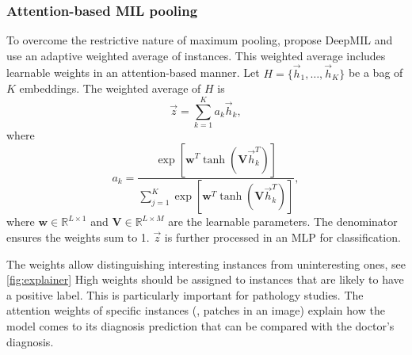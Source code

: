 \subsubsection{Attention-based MIL pooling}
To overcome the restrictive nature of maximum pooling, \textcite{Ilse2018} propose DeepMIL and use an adaptive weighted average of instances.
This weighted average includes learnable weights in an attention-based manner.
Let $H=\{\vec{h}_1, \ldots, \vec{h}_K\}$ be a bag of $K$ embeddings.
The weighted average of $H$ is
\begin{equation}
    \vec{z}=\sum_{k=1}^{K}a_k\vec{h}_k,
\end{equation}
where
\begin{equation}
    a_k = \frac{\exp\left[\mathbf{w}^T \tanh (\mathbf{V}\vec{h}_k^T)\right]}{\sum_{j=1}^{K}\exp\left[\mathbf{w}^T \tanh (\mathbf{V}\vec{h}_k^T)\right]},
\end{equation}
where $\mathbf{w} \in \mathbb{R}^{L \times 1}$ and $\mathbf{V}\in \mathbb{R}^{L \times M}$ are the learnable parameters.
The denominator ensures the weights sum to 1.
$\vec{z}$ is further processed in an MLP for classification.

The weights allow distinguishing interesting instances from uninteresting ones, see \cref{fig:explainer}
High weights should be assigned to instances that are likely to have a positive label.
This is particularly important for pathology studies.
The attention weights of specific instances (\eg, patches in an image) explain how the model comes to its diagnosis prediction that can be compared with the doctor's diagnosis.

\begin{figure*}
    \centering
    
    \caption[Tile importances]{
        Visualizing tile importances.
        The attention weights resulting from VarMIL are min-max-normalized and multiplied with their corresponding tile.
        The output is an attention weighted image with bright parts relating to high attention and dark parts relating to low attention.
        Note that dark tiles can still have high attentions if the original image contains dark patches with useful information.
    }
    \label{fig:explainer}
\end{figure*}

